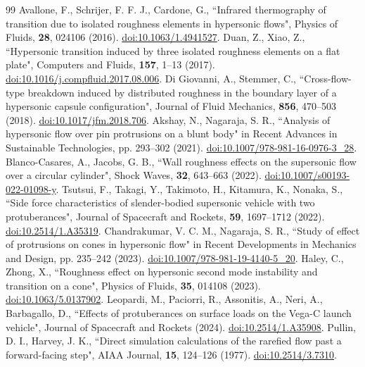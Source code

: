 \documentclass[aip,pof,preprint,notitlepage,floatfix,amsmath,amssymb]{revtex4-2}
\begin{document}
\begin{thebibliography}{99}
 Avallone, F., Schrijer, F. F. J., Cardone, G., ``Infrared thermography of transition due to isolated roughness elements in hypersonic flows", Physics of Fluids, \textbf{28}, 024106 (2016). \href{https://doi.org/10.1063/1.4941527}{doi:10.1063/1.4941527}.
 Duan, Z., Xiao, Z., ``Hypersonic transition induced by three isolated roughness elements on a flat plate", Computers and Fluids, \textbf{157}, 1--13 (2017). \href{https://doi.org/10.1016/j.compfluid.2017.08.006}{doi:10.1016/j.compfluid.2017.08.006}.
 Di Giovanni, A., Stemmer, C., ``Cross-flow-type breakdown induced by distributed roughness in the boundary layer of a hypersonic capsule configuration", Journal of Fluid Mechanics, \textbf{856}, 470--503 (2018). \href{https://doi.org/10.1017/jfm.2018.706}{doi:10.1017/jfm.2018.706}.
 Akshay, N., Nagaraja, S. R., ``Analysis of hypersonic flow over pin protrusions on a blunt body" in Recent Advances in Sustainable Technologies, pp. 293--302 (2021). \href{https://doi.org/10.1007/978-981-16-0976-3_28}{doi:10.1007/978-981-16-0976-3\_28}.
 Blanco-Casares, A., Jacobs, G. B., ``Wall roughness effects on the supersonic flow over a circular cylinder", Shock Waves, \textbf{32}, 643--663 (2022). \href{https://doi.org/10.1007/s00193-022-01098-y}{doi:10.1007/s00193-022-01098-y}.
 Tsutsui, F., Takagi, Y., Takimoto, H., Kitamura, K., Nonaka, S., ``Side force characteristics of slender-bodied supersonic vehicle with two protuberances", Journal of Spacecraft and Rockets, \textbf{59}, 1697--1712 (2022). \href{https://doi.org/10.2514/1.A35319}{doi:10.2514/1.A35319}.
 Chandrakumar, V. C. M., Nagaraja, S. R., ``Study of effect of protrusions on cones in hypersonic flow" in Recent Developments in Mechanics and Design, pp. 235--242 (2023). \href{https://doi.org/10.1007/978-981-19-4140-5_20}{doi:10.1007/978-981-19-4140-5\_20}.
 Haley, C., Zhong, X., ``Roughness effect on hypersonic second mode instability and transition on a cone", Physics of Fluids, \textbf{35}, 014108 (2023). \href{https://doi.org/10.1063/5.0137902}{doi:10.1063/5.0137902}.
 Leopardi, M., Paciorri, R., Assonitis, A., Neri, A., Barbagallo, D., ``Effects of protuberances on surface loads on the Vega-C launch vehicle", Journal of Spacecraft and Rockets (2024). \href{https://doi.org/10.2514/1.A35908}{doi:10.2514/1.A35908}.
 Pullin, D. I., Harvey, J. K., ``Direct simulation calculations of the rarefied flow past a forward-facing step", AIAA Journal, \textbf{15}, 124--126 (1977). \href{https://doi.org/10.2514/3.7310}{doi:10.2514/3.7310}.

\end{thebibliography}
\end{document}

